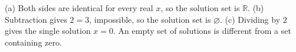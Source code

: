 (a) Both sides are identical for every real $x$, so the solution set is $\boxed{\mathbb R}$. (b) Subtraction gives $2=3$, impossible, so the solution set is $\boxed{\varnothing}$. (c) Dividing by $2$ gives the single solution $\boxed{x=0}$. An empty set of solutions is different from a set containing zero.
